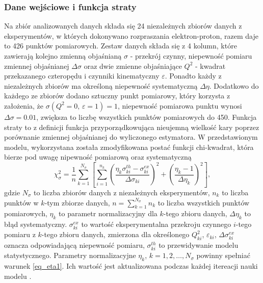 \documentclass[11pt]{book}
\theoremstyle{definition}
\begin{document}
\subsubsection{Dane wejściowe i funkcja straty}
%
%
Na zbiór analizowanych danych składa się 24 niezależnych zbiorów danych z eksperymentów, w których dokonywano rozpraszania elektron-proton, razem daje to 426 punktów pomiarowych. Zestaw danych składa się z 4 kolumn, które zawierają kolejno zmienną objaśnianą $\sigma$ - przekrój czynny, niepewność pomiaru zmiennej objaśnianej $\Delta \sigma$ oraz dwie zmienne objaśniające $Q^2$ - kwadrat przekazanego czteropędu i czynniki kinematyczny $\varepsilon$. Ponadto każdy z niezależnych zbiorów ma określoną niepewność systematyczną $\Delta \eta$.  Dodatkowo do każdego ze zbiorów dodano sztuczny punkt pomiarowy, który korzysta z założenia, że $\sigma \left(Q^2 = 0, \, \varepsilon = 1 \right) = 1$, niepewność pomiarowa punktu wynosi $\Delta \sigma = 0.01$, zwiększa to liczbę wszystkich punktów pomiarowych do 450.
%
%
%
Funkcja straty to z definicji funkcja przyporządkowująca nieujemną wielkość kary poprzez porównanie zmiennej objaśnianej do wyliczonego estymatora. W przedstawionym modelu, wykorzystana została zmodyfikowana postać funkcji chi-kwadrat, która bierze pod uwagę nipewność pomiarową oraz systematyczną
%
%
\begin{equation}
\chi_{\sigma}^2 = \frac{1}{n}  \sum_{k=1}^{N_{\sigma}} \left[ \sum_{i=1}^{n_k} \left( \frac{\eta_k \sigma^{th}_{ki} - \sigma^{ex}_{ki}}{\Delta \sigma_{ki}} \right)^2 + \left(\frac{\eta_k - 1}{\Delta \eta_k}\right)^2 \right],
\end{equation}
%
gdzie $N_{\sigma}$ to liczba zbiorów danych z niezależnych eksperymentów, $n_k$ to liczba punktów w $k$-tym zbiorze danych, $n = \sum_{k=1}^{N_{\sigma}}n_k$ to liczba wszystkich punktów pomiarowych, $\eta_k$ to parametr normalizacyjny dla $k$-tego zbioru danych, $\Delta \eta_k$ to błąd systematyczny. $\sigma^{ex}_{ki}$ to wartość eksperymentalna przekroju czynnego $i$-tego pomiaru z $k$-tego zbioru danych, zmierzona dla określonego $Q^2_{ki}$, $\varepsilon_{ki}$, $\Delta \sigma_{ki}^{ex}$ oznacza odpowiadającą niepewność pomiaru, $\sigma_{ki}^{th}$ to przewidywanie modelu statystycznego. Parametry normalizacyjne $\eta_k$, $k =1,2,\dots, N_{\sigma}$ powinny spełniać warunek \ref{eq_eta1}. Ich wartość jest aktualizowana podczas każdej itereacji nauki modelu  \cite{PhysRevC.84.034314}.
\end{document}
